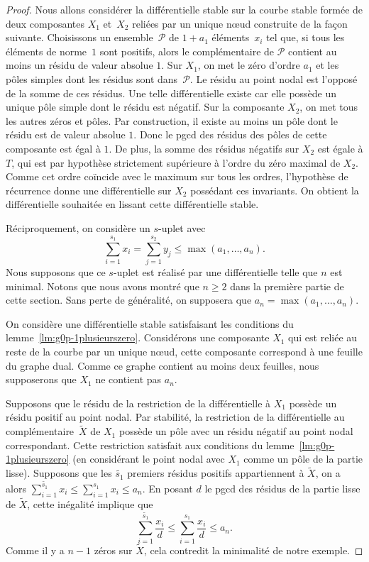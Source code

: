 \documentclass[JEP,XML,SOM,Unicode,francais,NoFloatCountersInSection,published]{cedram}
\let\mathcal\mathscr
\theoremstyle{definition}
\begin{document}
\begin{proof}
Nous allons considérer la différentielle stable sur la courbe stable formée de deux composantes $X_{1}$ et~$X_{2}$ reliées par un unique nœud construite de la façon suivante. Choisissons un ensemble~$\mathcal{P}$ de $1 + a_1$ éléments~$x_{i}$ tel que, si tous les éléments de norme~$1$ sont positifs, alors le complémentaire de $\mathcal{P}$ contient au moins un résidu de valeur absolue $1$. Sur $X_1$, on met le zéro d’ordre $a_1$ et les pôles simples dont les résidus sont dans~$\mathcal{P}$. Le résidu au point nodal est l'opposé de la somme de ces résidus. Une telle différentielle existe car elle possède un unique pôle simple dont
le résidu est négatif. Sur la composante $X_2$, on met tous les autres zéros et pôles. Par construction, il existe au moins un pôle dont le résidu est de valeur absolue $1$. Donc le pgcd des résidus des pôles de cette composante est égal à $1$. De plus, la somme des résidus négatifs sur $X_{2}$ est égale à $T$, qui est par hypothèse strictement
supérieure à l'ordre du zéro maximal de $X_{2}$. Comme cet ordre coïncide avec le maximum sur tous les ordres, l’hypothèse de récurrence donne une différentielle sur $X_{2}$ possédant ces invariants. On obtient la différentielle souhaitée en lissant cette différentielle stable.

Réciproquement, on considère un $s$-uplet avec\vspace*{-3pt}
\[
\sum_{i=1}^{s_{1}} x_{i} = \sum_{j=1}^{s_{2}} y_{j} \leq \max(a_{1},\dots,a_{n}).
\]
Nous supposons que ce $s$-uplet est réalisé par une différentielle telle que $n$ est minimal. Notons que nous avons montré que $n\geq2$ dans la première partie de cette section. Sans perte de généralité, on supposera que $a_{n}= \max(a_{1},\dots,a_{n})$.

On considère une différentielle stable satisfaisant les conditions du lemme~\ref{lm:g0p-1plusieurszero}. Considérons une composante $X_{1}$ qui est reliée au reste de la courbe par un unique nœud, \ie cette composante correspond à une feuille du graphe dual. Comme ce graphe contient au moins deux feuilles, nous supposerons que $X_{1}$ ne contient pas $a_{n}$.

Supposons que le résidu de la restriction de la différentielle à $X_{1}$ possède un résidu positif au point nodal. Par stabilité, la restriction de la différentielle au complémentaire~$\tilde X$ de $X_{1}$ possède un pôle avec un résidu négatif au point nodal correspondant. Cette restriction satisfait aux conditions du lemme~\ref{lm:g0p-1plusieurszero} (en considérant le point nodal avec $X_{1}$ comme un pôle de la partie lisse). Supposons que les $\tilde{s_{1}}$ premiers résidus positifs appartiennent à $\tilde X$, on a alors $\sum_{i=1}^{\tilde{s_{1}}} x_{i} \leq \sum_{i=1}^{s_{1}} x_{i} \leq a_{n}$. En posant $d$ le pgcd des résidus de la partie lisse de $\tilde{X}$, cette inégalité implique que\vspace*{-3pt}
\[
\sum_{i=1}^{\tilde{s_{1}}} \frac{x_{i}}{d} \leq \sum_{i=1}^{s_{1}} \frac{x_{i}}{d} \leq a_{n}.
\]
Comme il y a $n-1$ zéros sur $\tilde X$, cela contredit la minimalité de notre exemple.
\end{proof}
\end{document}
